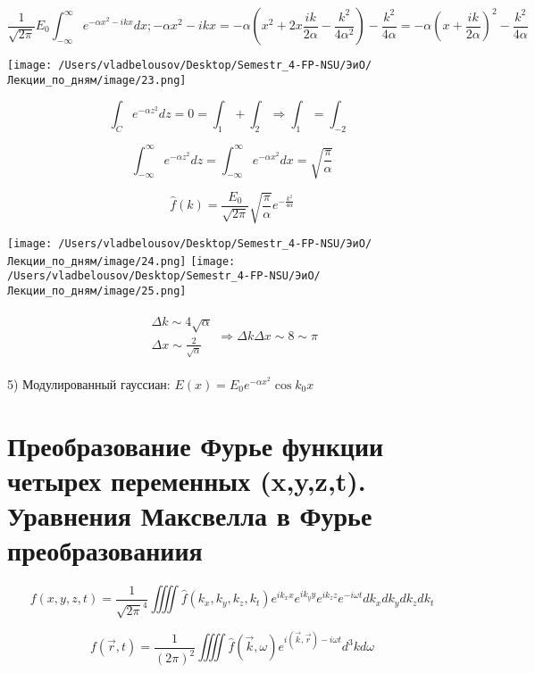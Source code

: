 \documentclass[12pt, a4paper]{report}
\begin{document}
\[ \frac{1}{\sqrt{2 \pi}}E_0 \int_{-\infty}^{\infty} e^{- \alpha x ^2 - ikx } dx ; -\alpha x ^2 - ikx = -\alpha \left( x ^2 + 2x \frac{ik}{2 \alpha} - \frac{k ^2}{4 \alpha ^2}   \right) - \frac{k ^2}{4\alpha} =  - \alpha \left( x + \frac{ik}{2\alpha} \right) ^2 - \frac{k ^2}{4\alpha}    \] 

\begin{center}
    \texttt{[image: /Users/vladbelousov/Desktop/Semestr\_4-FP-NSU/ЭиО/Лекции\_по\_дням/image/23.png]}
\end{center}

\[  \int_{C} e^{- \alpha z ^2 }dz = 0 = \int_{1} + \int_{ 2} \Rightarrow \int_{1} = \int _{-2}  \] 

\[ \int_{-\infty}^{\infty} e^{-\alpha z ^2 } dz = \int_{-\infty}^{\infty} e^{ - \alpha x ^2 } dx = \sqrt{\frac{\pi}{\alpha} }    \] 

\[ \hat{f} (k) = \frac{ E_0}{\sqrt{2 \pi}} \sqrt{\frac{\pi}{\alpha}} e^{- \frac{k ^2}{4 \alpha} }    \]

\begin{center}
    \texttt{[image: /Users/vladbelousov/Desktop/Semestr\_4-FP-NSU/ЭиО/Лекции\_по\_дням/image/24.png]}
    \texttt{[image: /Users/vladbelousov/Desktop/Semestr\_4-FP-NSU/ЭиО/Лекции\_по\_дням/image/25.png]}
\end{center}


\[\begin{aligned}
    \begin{array}{l}
        \Delta k \sim  4 \sqrt{\alpha} \\
        \Delta x \sim \frac{2}{\sqrt{\alpha}}
    \end{array}
    \Rightarrow 
    \Delta k \Delta x \sim 8 \sim \pi 
\end{aligned} \] 

5) Модулированный гауссиан: \( E(x) = E_0 e^{ - \alpha x ^2} \cos k_0x \) 

\section{Преобразование Фурье функции четырех переменных (x,y,z,t). Уравнения Максвелла в Фурье преобразованиия}

\[ f(x,y,z,t) = \frac{1}{\sqrt{ 2 \pi} ^4} \iiiint \hat{f}(k_x,k_y,k_z,k_t) e^{  i k_x x } e^{ i k_y y } e^{  i k_z z } e^{ - i \omega t } dk_x dk_y dk_z dk_t    \] 

\[ f( \vec{r},t) = \frac{1}{(2 \pi) ^2 } \iiiint \hat{f} ( \vec{k}, \omega) e^{ i( \vec{k},\vec{r})- i\omega t} d^3 k d \omega    \]  
\end{document}
